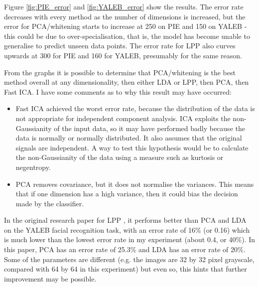 \documentclass[12pt]{article} %
\begin{document}
Figure \ref{fig:PIE_error} and \ref{fig:YALEB_error} show the results. The error rate decreases with every method as the number of dimensions is increased, but the error for PCA/whitening starts to increase at 250 on PIE and 150 on YALEB - this could be due to over-specialisation, that is, the model has become unable to generalise to predict unseen data points. The error rate for LPP also curves upwards at 300 for PIE and 160 for YALEB, presumably for the same reason.

From the graphs it is possible to determine that PCA/whitening is the best method overall at any dimensionality, then either LDA or LPP, then PCA, then Fast ICA. I have some comments as to why this result may have occurred:

\begin{itemize}
\item Fast ICA achieved the worst error rate, because the distribution of the data is not appropriate for independent component analysis. ICA exploits the non-Gaussianity of the input data, so it may have performed badly because the data is normally or normally distributed. It also assumes that the original signals are independent. A way to test this hypothesis would be to calculate the non-Gaussianity of the data using a measure such as kurtosis or negentropy.
\item PCA removes covariance, but it does not normalise the variances. This means that if one dimension has a high variance, then it could bias the decision made by the classifier.
\end{itemize}

In the original research paper for LPP \cite{localitypreserve}, it performs better than PCA and LDA on the YALEB facial recognition task, with an error rate of 16\% (or 0.16) which is much lower than the lowest error rate in my experiment (about 0.4, or 40\%). In this paper, PCA has an error rate of 25.3\% and LDA has an error rate of 20\%. Some of the parameters are different (e.g. the images are 32 by 32 pixel grayscale, compared with 64 by 64 in this experiment) but even so, this hints that further improvement may be possible.
\end{document}
